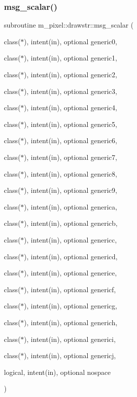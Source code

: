 \subsubsection{\texorpdfstring{msg\+\_\+scalar()}{msg\_scalar()}}
{\footnotesize\ttfamily subroutine m\+\_\+pixel\+::drawstr\+::msg\+\_\+scalar (\begin{DoxyParamCaption}\item[{class($\ast$), intent(in), optional}]{generic0,  }\item[{class($\ast$), intent(in), optional}]{generic1,  }\item[{class($\ast$), intent(in), optional}]{generic2,  }\item[{class($\ast$), intent(in), optional}]{generic3,  }\item[{class($\ast$), intent(in), optional}]{generic4,  }\item[{class($\ast$), intent(in), optional}]{generic5,  }\item[{class($\ast$), intent(in), optional}]{generic6,  }\item[{class($\ast$), intent(in), optional}]{generic7,  }\item[{class($\ast$), intent(in), optional}]{generic8,  }\item[{class($\ast$), intent(in), optional}]{generic9,  }\item[{class($\ast$), intent(in), optional}]{generica,  }\item[{class($\ast$), intent(in), optional}]{genericb,  }\item[{class($\ast$), intent(in), optional}]{genericc,  }\item[{class($\ast$), intent(in), optional}]{genericd,  }\item[{class($\ast$), intent(in), optional}]{generice,  }\item[{class($\ast$), intent(in), optional}]{genericf,  }\item[{class($\ast$), intent(in), optional}]{genericg,  }\item[{class($\ast$), intent(in), optional}]{generich,  }\item[{class($\ast$), intent(in), optional}]{generici,  }\item[{class($\ast$), intent(in), optional}]{genericj,  }\item[{logical, intent(in), optional}]{nospace }\end{DoxyParamCaption})\hspace{0.3cm}{\ttfamily [private]}}



